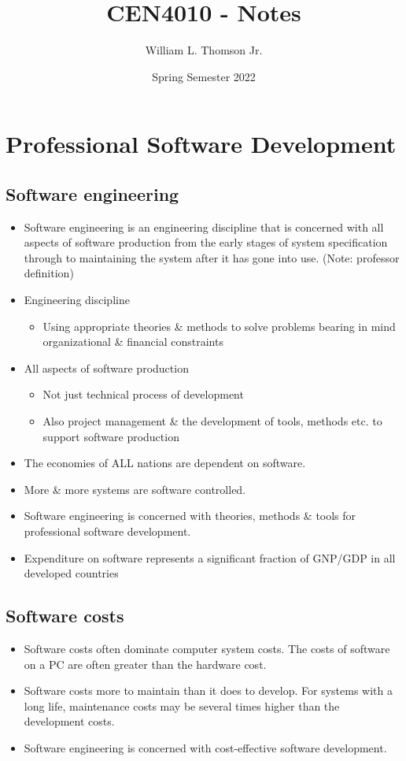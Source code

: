 \documentclass{report}
\title{\textbf{CEN4010 - Notes}}
\author{William L. Thomson Jr.}
\date{Spring Semester 2022}
\begin{document}
\maketitle
\tableofcontents
\newpage

\chapter{Professional Software Development}
\section{Software engineering}
\begin{itemize}
  \item Software engineering is an engineering discipline that is concerned with all aspects of software production from the early stages of system specification through to maintaining the system after it has gone into use. (Note: professor definition)
  \item Engineering discipline
  \begin{itemize}
    \item Using appropriate theories \& methods to solve problems bearing in mind
organizational \& financial constraints
\end{itemize}
  \item All aspects of software production
  \begin{itemize}
    \item Not just technical process of development
    \item Also project management \& the development of tools, methods etc. to support software production
  \end{itemize}
  \item The economies of ALL nations are dependent on software.
  \item More \& more systems are software controlled.
  \item Software engineering is concerned with theories, methods \& tools for professional software development.
  \item Expenditure on software represents a significant fraction of GNP/GDP in all developed countries
\end{itemize}

\section{Software costs}
\begin{itemize}
  \item Software costs often dominate computer system costs. The costs of software on a PC are often greater than the hardware cost.
  \item Software costs more to maintain than it does to develop. For systems with a long life, maintenance costs may be several times higher than the development costs.
  \item Software engineering is concerned with cost-effective software development.
\end{itemize}
\end{document}
